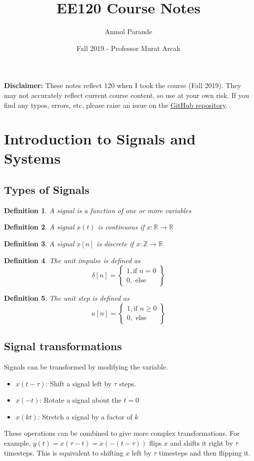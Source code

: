 \documentclass{article}
\newtheorem{definition}{Definition}
\begin{document}
\title{EE120 Course Notes}
\author{Anmol Parande}
\date{Fall 2019 - Professor Murat Arcak}
\maketitle
\textbf{Disclaimer: }These notes reflect 120 when I took the course (Fall 2019). They may not accurately reflect current course content, so use at your own risk.
If you find any typos, errors, etc, please raise an issue on the \href{https://github.com/parandea17/BerkeleyNotes}{GitHub repository}.\\
\tableofcontents
\newpage
\section{Introduction to Signals and Systems}
\subsection{Types of Signals}
\begin{definition}
    A signal is a function of one or more variables
\end{definition}
\begin{definition}
    A signal $x(t)$ is continuous if $x: \mathbb{R} \rightarrow \mathbb{R}$
\end{definition}
\begin{definition}
    A signal $x[n]$ is discrete if $x: \mathbb{Z} \rightarrow \mathbb{R}$
\end{definition}
\begin{definition}
    The unit impulse is defined as 
    \[
        \delta[n] = \left\{
            \begin{array}{cc}
                1, \text{if } n=0\\
                0, \text{ else}
            \end{array}
            \right\}
    \]
\end{definition}
\begin{definition}
    The unit step is defined as 
    \[
        u[n] = \left\{
            \begin{array}{cc}
                1, \text{if } n \geq 0\\
                0, \text{ else}
            \end{array}
            \right\}
    \]
\end{definition}
\subsection{Signal transformations}
Signals can be transformed by modifying the variable.
\begin{itemize}
    \item $x(t - \tau)$: Shift a signal left by $\tau$ steps.
    \item $x(-t)$: Rotate a signal about the $t=0$
    \item $x(kt)$: Stretch a signal by a factor of $k$
\end{itemize}
These operations can be combined to give more complex transformations.
For example, $y(t) = x(\tau - t) = x(-(t-\tau))$ flips $x$ and shifts it right by $\tau$ timesteps.
This is equivalent to shifting $x$ left by $\tau$ timesteps and then flipping it.
\end{document}
